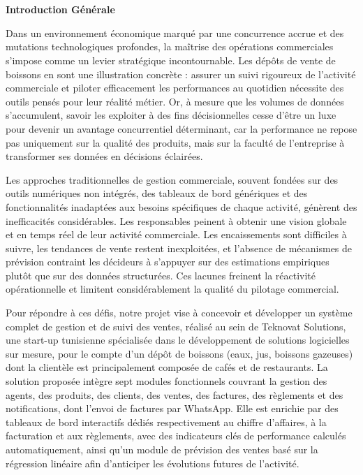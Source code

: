\chapter*{}

\begin{center}
{\fontsize{20}{24}\selectfont\bfseries\color{black} Introduction Générale}
\end{center}

\vspace{12pt}

Dans un environnement économique marqué par une concurrence accrue et des mutations 
technologiques profondes, la maîtrise des opérations commerciales s'impose comme un levier 
stratégique incontournable. Les dépôts de vente de boissons en sont une illustration concrète : 
assurer un suivi rigoureux de l'activité commerciale et piloter efficacement les performances 
au quotidien nécessite des outils pensés pour leur réalité métier. Or, à mesure que les volumes 
de données s'accumulent, savoir les exploiter à des fins décisionnelles cesse d'être un luxe 
pour devenir un avantage concurrentiel déterminant, car la performance ne repose pas uniquement 
sur la qualité des produits, mais sur la faculté de l'entreprise à transformer ses données en 
décisions éclairées.

Les approches traditionnelles de gestion commerciale, souvent fondées sur des outils numériques 
non intégrés, des tableaux de bord génériques et des fonctionnalités inadaptées aux besoins 
spécifiques de chaque activité, génèrent des inefficacités considérables. Les responsables 
peinent à obtenir une vision globale et en temps réel de leur activité commerciale. Les 
encaissements sont difficiles à suivre, les tendances de vente restent inexploitées, et 
l'absence de mécanismes de prévision contraint les décideurs à s'appuyer sur des estimations 
empiriques plutôt que sur des données structurées. Ces lacunes freinent la réactivité 
opérationnelle et limitent considérablement la qualité du pilotage commercial.

Pour répondre à ces défis, notre projet vise à concevoir et développer un système complet de 
gestion et de suivi des ventes, réalisé au sein de Teknovat Solutions, une start-up tunisienne 
spécialisée dans le développement de solutions logicielles sur mesure, pour le compte d'un 
dépôt de boissons (eaux, jus, boissons gazeuses) dont la clientèle est principalement composée 
de cafés et de restaurants. La solution proposée intègre sept modules fonctionnels couvrant la 
gestion des agents, des produits, des clients, des ventes, des factures, des règlements et des 
notifications, dont l'envoi de factures par WhatsApp. Elle est enrichie par des tableaux de 
bord interactifs dédiés respectivement au chiffre d'affaires, à la facturation et aux règlements, 
avec des indicateurs clés de performance calculés automatiquement, ainsi qu'un module de 
prévision des ventes basé sur la régression linéaire afin d'anticiper les évolutions futures 
de l'activité.

